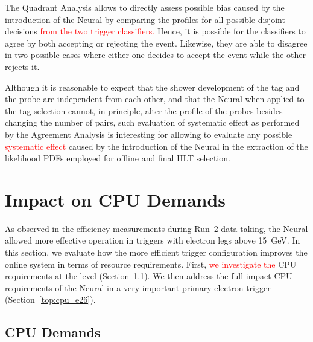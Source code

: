 The Quadrant Analysis allows to directly assess possible bias caused by the
introduction of the Neural\rnn{} by comparing the profiles for all possible disjoint
decisions \textcolor{red}{from the two trigger classifiers.} Hence, it is possible for the classifiers
to agree by both accepting or rejecting the event. Likewise, they are able to
disagree in two possible cases where either one decides to accept the event
while the other rejects it.

Although it is reasonable to expect that the shower development of the tag and
the probe are independent from each other, and that the Neural\rnn{} when applied to
the tag selection cannot, in principle, alter the profile of the probes besides
changing the number of \tnp{} pairs, such evaluation of systematic effect as
performed by the Agreement Analysis is interesting for allowing to evaluate any
possible \textcolor{red}{systematic effect} caused by the introduction of the Neural\rnn{} in the extraction of the
likelihood PDFs employed for offline and final HLT selection.

\FloatBarrier
\section{Impact on CPU Demands}\label{ssec:cpu_reduction}

As observed in the efficiency measurements during Run~2 data taking, the Neural\rnn{}
allowed more effective \fastcalo{} operation in triggers with electron legs
above \SI{15}{\GeV}. In this section, we evaluate how the more efficient trigger
configuration improves the online system in terms of resource requirements.
First, \textcolor{red}{we investigate the} CPU requirements at the \fastcalo{}
level (Section~\ref{top:fastcalo_cpu}). We then address the full impact CPU
requirements of the Neural\rnn{} in a very important primary electron trigger
(Section~\ref{top:cpu_e26}).

\subsection{\fastcalo{} CPU Demands}\label{top:fastcalo_cpu}


